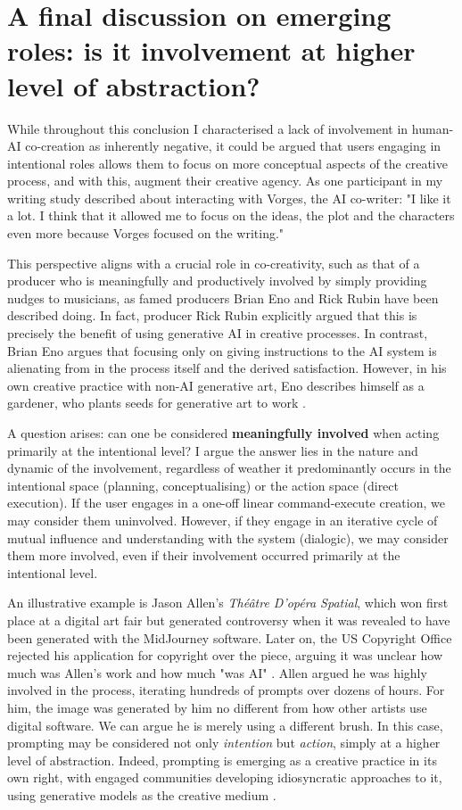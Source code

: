 \section{A final discussion on emerging roles: is it involvement at higher level of abstraction?}

While throughout this conclusion I characterised a lack of involvement in human-AI co-creation as inherently negative, it could be argued that users engaging in intentional roles allows them to focus on more conceptual aspects of the creative process, and with this, augment their creative agency. As one participant in my writing study described about interacting with Vorges, the AI co-writer: "I like it a lot. I think that it allowed me to focus on the ideas, the plot and the characters even more because Vorges focused on the writing."

This perspective aligns with a crucial role in co-creativity, such as that of a producer who is meaningfully and productively involved by simply providing nudges to musicians, as famed producers Brian Eno and Rick Rubin have been described doing. In fact, producer Rick Rubin explicitly argued that this is precisely the benefit of using generative AI in creative processes. In contrast, Brian Eno argues that focusing only on giving instructions to the AI system is alienating from in the process itself and the derived satisfaction. However, in his own creative practice with non-AI generative art, Eno describes himself as a gardener, who plants seeds for generative art to work \cite{Eno2007-fl}. 

A question arises: can one be considered \textbf{meaningfully involved} when acting primarily at the intentional level? I argue the answer lies in the nature and dynamic of the involvement, regardless of weather it predominantly occurs in the intentional space (planning, conceptualising) or the action space (direct execution). If the user engages in a one-off linear command-execute creation, we may consider them uninvolved. However, if they engage in an iterative cycle of mutual influence and understanding with the system (dialogic), we may consider them more involved, even if their involvement occurred primarily at the intentional level.

An illustrative example is Jason Allen's \textit{Théâtre D'opéra Spatial}, which won first place at a digital art fair but generated controversy when it was revealed to have been generated with the MidJourney software. Later on, the US Copyright Office rejected his application for copyright over the piece, arguing it was unclear how much was Allen's work and how much "was AI" \cite{US-Copyright-Office-Review-Board2023-nw}. Allen argued he was highly involved in the process, iterating hundreds of prompts over dozens of hours. For him, the image was generated by him no different from how other artists use digital software. We can argue he is merely using a different brush. In this case, prompting may be considered not only \textit{intention} but \textit{action}, simply at a higher level of abstraction.  Indeed, prompting is emerging as a creative practice in its own right, with engaged communities developing idiosyncratic approaches to it, using generative models as the creative medium \cite{Chang2023-tv, Smith2022-dm}.

